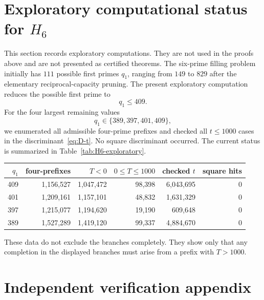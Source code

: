 \documentclass[11pt]{amsart}
\theoremstyle{plain}
\theoremstyle{definition}
\theoremstyle{remark}
\begin{document}
\section{Exploratory computational status for \texorpdfstring{$H_6$}{H6}}

This section records exploratory computations.  They are not used in the proofs above and are not presented as certified theorems.  The six-prime filling problem initially has $111$ possible first primes $q_1$, ranging from $149$ to $829$ after the elementary reciprocal-capacity pruning.  The present exploratory computation reduces the possible first prime to
\[
        q_1\le409.
\]
For the four largest remaining values
\[
        q_1\in\{389,397,401,409\},
\]
we enumerated all admissible four-prime prefixes and checked all $t\le1000$ cases in the discriminant~\eqref{eq:D-t}.  No square discriminant occurred.  The current status is summarized in Table~\ref{tab:H6-exploratory}.

\begin{center}
\begin{tabular}{rrrrrr}
\toprule
$q_1$ & four-prefixes & $T<0$ & $0\le T\le1000$ & checked $t$ & square hits \\
\midrule
409 & 1,156,527 & 1,047,472 & 98,398 & 6,043,695 & 0 \\
401 & 1,209,161 & 1,157,101 & 48,832 & 1,631,329 & 0 \\
397 & 1,215,077 & 1,194,620 & 19,190 & 609,648 & 0 \\
389 & 1,527,289 & 1,419,120 & 99,337 & 4,884,670 & 0 \\
\bottomrule
\end{tabular}
\label{tab:H6-exploratory}
\end{center}

These data do not exclude the branches completely.  They show only that any completion in the displayed branches must arise from a prefix with $T>1000$.




\section{Independent verification appendix}
\end{document}
